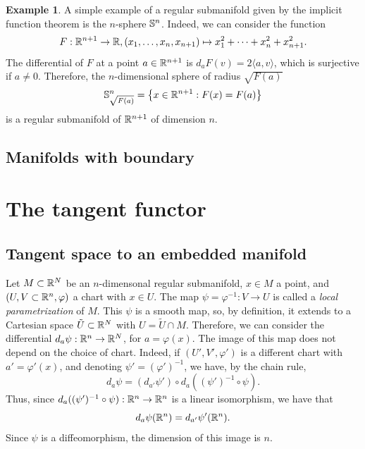 \documentclass[11pt,a4paper]{book}
\theoremstyle{remark} \newtheorem{rmk}[thm]{Remark}
\theoremstyle{definition} \newtheorem{defn}[thm]{Definition}
\theoremstyle{definition} \newtheorem{ex}[thm]{Example}
\theoremstyle{definition} \newtheorem{ej}[thm]{Exercise}
\begin{document}
\begin{ex}
  A simple example of a regular submanifold given by the implicit function theorem is the $n$-sphere $\mathbb S^n$. Indeed, we can consider the function
  \begin{equation*}
F: \mathbb R^{n+1}\rightarrow \mathbb R, (x_1,\dots,x_n,x_{n+1}) \mapsto x_1^2 + \cdots + x_n^2 + x_{n+1}^2.
  \end{equation*}
  The differential of $F$ at a point $a\in \mathbb R^{n+1}$ is $d_aF(v)=2 \langle a, v \rangle$, which is surjective if $a\neq 0$. Therefore, the $n$-dimensional sphere of radius $\sqrt{F(a)}$
  \begin{equation*}
\mathbb S^{n}_{\sqrt{F(a)}} = \left\{ x\in \mathbb R^{n+1}: F(x)=F(a) \right\}
  \end{equation*}
is a regular submanifold of $\mathbb R^{n+1}$ of dimension $n$.
\end{ex}

\subsection{Manifolds with boundary}
\todo{}

\section{The tangent functor}
\subsection{Tangent space to an embedded manifold}
Let $M\subset \mathbb R^N$ be an $n$-dimensonal regular submanifold, $x\in M$ a point, and $(U,V\subset \mathbb R^n,\varphi)$ a chart with $x\in U$. The map $\psi=\varphi^{-1}:V\rightarrow U$ is called a \emph{local parametrization} of $M$. This $\psi$ is a smooth map, so, by definition, it extends to a Cartesian space $\tilde{U}\subset \mathbb R^N$ with $U=\tilde{U}\cap M$. Therefore, we can consider the differential $d_a\psi:\mathbb R^n \rightarrow \mathbb R^N$, for $a=\varphi(x)$. The image of this map does not depend on the choice of chart. Indeed, if $(U',V',\varphi')$ is a different chart with $a'=\varphi'(x)$, and denoting $\psi'=(\varphi')^{-1}$, we have, by the chain rule,
\begin{equation*}
d_a \psi = (d_{a' } \psi'  ) \circ d_a((\psi')^{-1}\circ \psi).
\end{equation*}
Thus, since $d_a((\psi')^{-1}\circ \psi):\mathbb R^n \rightarrow \mathbb R^n$ is a linear isomorphism, we have that \[d_a \psi(\mathbb R^n)=d_{a' }\psi' (\mathbb R^n).\]
Since $\psi$ is a diffeomorphism, the dimension of this image is $n$.
\end{document}
